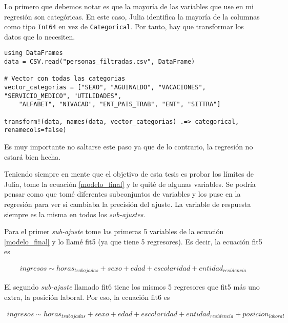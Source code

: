 Lo primero que debemos notar es que la mayoría de las variables que use en mi regresión son categóricas. En este caso, Julia identifica la mayoría de la columnas como tipo \texttt{Int64} en vez de \texttt{Categorical}. Por tanto, hay que transformar los datos que lo necesiten. 

\begin{verbatim}
using DataFrames
data = CSV.read("personas_filtradas.csv", DataFrame)

# Vector con todas las categorias
vector_categorias = ["SEXO", "AGUINALDO", "VACACIONES", "SERVICIO_MEDICO", "UTILIDADES", 
    "ALFABET", "NIVACAD", "ENT_PAIS_TRAB", "ENT", "SITTRA"]

transform!(data, names(data, vector_categorias) .=> categorical, renamecols=false)
\end{verbatim}

Es muy importante no saltarse este paso ya que de lo contrario, la regresión no estará bien hecha. 

Teniendo siempre en mente que el objetivo de esta tesis es probar los límites de Julia, tome la ecuación \ref{modelo_final} y le quité de algunas variables. Se podría pensar como que tomé diferentes subconjuntos de variables y los puse en la regresión para ver si cambiaba la precisión del ajuste. La variable de respuesta siempre es la misma en todos los \textit{sub-ajustes}.


Para el primer \textit{sub-ajuste} tome las primeras 5 variables de la ecuación \ref{modelo_final} y lo llamé \textsf{fit5} (ya que tiene 5 regresores). Es decir, la ecuación \textsf{fit5} es 

\begin{equation*}
    \begin{aligned}
    ingresos \sim horas_{trabajadas} + sexo + edad + escolaridad + entidad_{residencia}
    \end{aligned}
\end{equation*}


El segundo \textit{sub-ajuste} llamado \textsf{fit6} tiene los mismos 5 regresores que \textsf{fit5} más uno extra, la posición laboral. Por eso, la ecuación \textsf{fit6} es 

\begin{equation*}
    \begin{aligned}
    ingresos \sim horas_{trabajadas} + sexo + edad + escolaridad + entidad_{residencia} + posicion_{laboral}
    \end{aligned}
\end{equation*}

